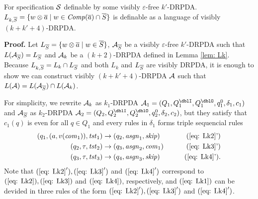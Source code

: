 \begin{lemma}\label{lem: LkS}
For specification ${\cal S}$ definable by some visibly $\varepsilon$-free $k'$-DRPDA.
$L_{k, {\overline{S}}} = \{w\otimes{\overline{a}} \mid w\in{\mathit{Comp}}({\overline{a}})\cap {\overline{S}}\}$
is definable as a language of visibly $(k+k'+4)$-DRPDA.
\end{lemma}
{\bf Proof.}\quad
Let $L_{{\overline{S}}} = \{w\otimes{\overline{a}}\mid w\in{\overline{S}}\}$,
${\cal A}_{{\overline{S}}}$ be a visibly $\varepsilon$-free $k'$-DRPDA such that $L({\cal A}_{{\overline{S}}})= L_{{\overline{S}}}$ and ${\cal A}_k$ be a $(k+2)$-DRPDA defined in Lemma \ref{lem: Lk}.
Because $L_{k, {\overline{S}}} = L_k \cap L_{{\overline{S}}}$ and both $L_k$ and $L_{{\overline{S}}}$ are
visibly DRPDA, it is enough to show we can construct visibly $(k+k'+4)$-DRPDA ${\cal A}$ such that $L({\cal A})=L({\cal A}_{{\overline{S}}})\cap L({\cal A}_k)$.

For simplicity, we rewrite ${\cal A}_k$ as $k_1$-DRPDA $\calA_1=(Q_1, Q^\dblI_1, Q^\dblO_1, q^0_1, \delta_1, c_1)$ and ${\cal A}_{{\overline{S}}}$ as $k_2$-DRPDA $\calA_2=(Q_2, Q^\dblI_2, Q^\dblO_2, q^0_2, \delta_2, c_2)$, but they satisfy that $c_1(q)$ is even for all $q\in Q_1$ and
every rules in $\delta_1$ forms triple sequencial rules
\begin{align}
(q_1, (a,v(\com_1)), \tst_1) &\to (q_2,\asgn_1, \skip)& \tag{\ref{eq: Lk2}'}\\
(q_2, \tau, \tst_2) &\to (q_3,\asgn_2, \com_1)& \tag{\ref{eq: Lk3}'}\\
(q_3, \tau, \tst_3) &\to (q_4,\asgn_3, \skip)& \tag{\ref{eq: Lk4}'}.
\end{align}
Note that $(\ref{eq: Lk2}'), (\ref{eq: Lk3}')$ and $(\ref{eq: Lk4}')$ correspond to $(\ref{eq: Lk2}), (\ref{eq: Lk3})$ and $(\ref{eq: Lk4})$, respectively, and $(\ref{eq: Lk1})$ can be devided in three rules of the form $(\ref{eq: Lk2}'), (\ref{eq: Lk3}')$ and $(\ref{eq: Lk4}')$.

